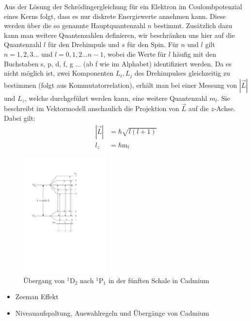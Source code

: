 \documentclass[11pt, a4paper]{article}
\begin{document}
Aus der Lösung der Schrödingergleichung für ein Elektron im Coulombpotenzial eines Kerns folgt, dass es nur diskrete Energiewerte annehmen kann.
Diese werden über die so genannte Hauptquantenzahl $n$ bestimmt.
Zusätzlich dazu kann man weitere Quantenzahlen definieren, wir beschränken uns hier auf die Quantenzahl $l$ für den Drehimpuls und $s$ für den Spin.
Für $n$ und $l$ gilt $n=1, 2, 3 \dots$ und $l=0, 1, 2 \dots n-1$, wobei die Werte für $l$ häufig mit den Buchstaben s, p, d, f, g $\dots$ (ab f wie im Alphabet) identifiziert werden.
Da es nicht möglich ist, zwei Komponenten $L_i, L_j$ des Drehimpulses gleichzeitig zu bestimmen (folgt aus Kommutatorrelation), erhält man bei einer Messung von $|\vec{L}|$ und $L_z$, welche durchgeführt werden kann, eine weitere Quantenzahl $m_l$. Sie beschreibt im Vektormodell anschaulich die Projektion von $\vec{L}$ auf die $z$-Achse.
Dabei gilt:
\begin{align*}
|\vec{L}|&=\si{\planckbar}\sqrt{l(l+1)}\\
l_z&=\si{\planckbar}\mathrm{m}_l
\end{align*}

\begin{figure}
\centering
\includegraphics[width=0.4\textwidth]{./figures/termschema_cadmium.pdf}
\caption{Übergang von $^1$D$_2$ nach $^1$P$_1$ in der fünften Schale in Cadmium}
\label{fig:termschema_cadmium}
\end{figure}

\begin{itemize}
\item Zeeman Effekt
\item Niveauaufspaltung, Auswahlregeln und Übergänge von Cadmium
\end{itemize}
\end{document}
